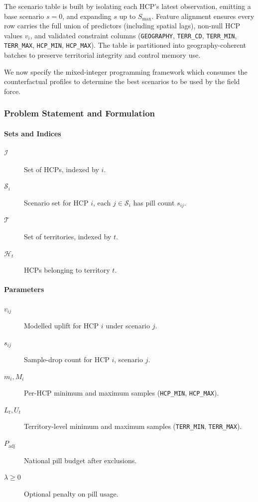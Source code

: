 The scenario table is built by isolating each HCP's latest observation, emitting a base scenario \(s=0\), and expanding \(s\) up to \(S_{\max}\). Feature alignment ensures every row carries the full union of predictors (including spatial lags), non-null HCP values \(v_i\), and validated constraint columns (\texttt{GEOGRAPHY}, \texttt{TERR\_CD}, \texttt{TERR\_MIN}, \texttt{TERR\_MAX}, \texttt{HCP\_MIN}, \texttt{HCP\_MAX}). The table is partitioned into geography-coherent batches to preserve territorial integrity and control memory use.

We now specify the mixed-integer programming framework which consumes the counterfactual profiles to determine the best scenarios to be used by the field force.

\subsubsection{Problem Statement and Formulation}
\label{sec:mip_problem}

\paragraph{Sets and Indices}
\begin{description}
  \item[\(\mathcal I\)] Set of HCPs, indexed by \(i\).
  \item[\(\mathcal S_i\)] Scenario set for HCP \(i\), each \(j\in\mathcal S_i\) has pill count \(s_{ij}\).
  \item[\(\mathcal T\)] Set of territories, indexed by \(t\).
  \item[\(\mathcal H_t\)] HCPs belonging to territory \(t\).
\end{description}

\paragraph{Parameters}
\begin{description}
  \item[\(v_{ij}\)] Modelled uplift for HCP \(i\) under scenario \(j\).
  \item[\(s_{ij}\)] Sample-drop count for HCP \(i\), scenario \(j\).
  \item[\(m_i, M_i\)] Per-HCP minimum and maximum samples (\texttt{HCP\_MIN}, \texttt{HCP\_MAX}).
  \item[\(L_t, U_t\)] Territory-level minimum and maximum samples (\texttt{TERR\_MIN}, \texttt{TERR\_MAX}).
  \item[\(P_{\mathrm{adj}}\)] National pill budget after exclusions.
  \item[\(\lambda\ge0\)] Optional penalty on pill usage.
\end{description}

